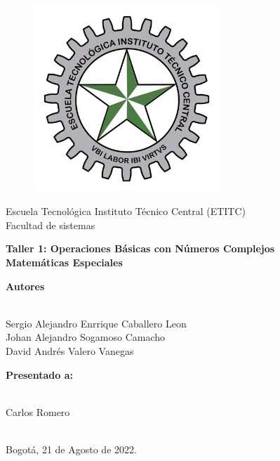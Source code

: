 \documentclass[a4paper,11pt,openany]{book}
\begin{document}
\begin{titlepage}
 
\begin{center}
\vspace*{-1in}
\begin{figure}[htb]
\begin{center}
\includegraphics[width=7cm]{ETITC.png}
\end{center}
\end{figure}
 
 
{\sc \huge Escuela Tecnológica Instituto Técnico Central (ETITC)}\\
\vspace*{0.15in}
Facultad de sistemas\\
\vspace*{0.6in}
\begin{Large}
\textbf{Taller 1: Operaciones Básicas con Números Complejos} \\
\textbf{Matem{\'a}ticas Especiales}\\
\end{Large}
\vspace*{0.3in}
\begin{large}
{\bf Autores} \\
 
\ 
 
Sergio Alejandro Enrrique Caballero Leon\\ 
Johan Alejandro Sogamoso Camacho \\ 
David Andrés Valero Vanegas \\ 
\end{large}
\vspace*{0.3in}
 
\end{center}
 
\begin{center}
{\bf Presentado a:} \\
 
\ 
 
Carlos Romero \\
 
\
 
Bogot{\'a}, 21 de Agosto de 2022.
\end{center}
 
\end{titlepage}
\end{document}

